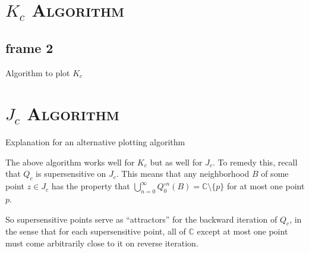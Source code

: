 \documentclass[xcolor=x11names,compress]{beamer}
\renewcommand{\(}{\begin{columns}}
\renewcommand{\)}{\end{columns}}
\newcommand{\<}[1]{\begin{column}{#1}}
\renewcommand{\>}{\end{column}}
\begin{document}
\section{\scshape $K_c$ Algorithm}

\subsection{frame 2}
\begin{frame}

\begin{algorithm}[H]
  \DontPrintSemicolon
  \LinesNumbered


 {
}
\caption{Algorithm to plot $K_c$ }
\end{algorithm}

\end{frame}

\section{\scshape $J_c$ Algorithm}

\begin{frame}

Explanation for an alternative plotting algorithm

The above algorithm works well for $K_c$ but as well for $J_c$.
To remedy this, recall that $Q_c$ is supersensitive on $J_c$.
This means that any neighborhood $B$ of some point $z\in J_c$ has
the property that 
$\bigcup_{n=0}^\infty Q_0^{\circ n} (B) = \mathbb{C} \setminus \{p\}$ for at most one point $p$.

So supersensitive points serve as ``attractors'' for the backward iteration of $Q_c$, 
in the sense that for each supersensitive point, all of $\mathbb{C}$ except at most one point
must come arbitrarily close to it on reverse iteration. 


\end{frame}
\end{document}

